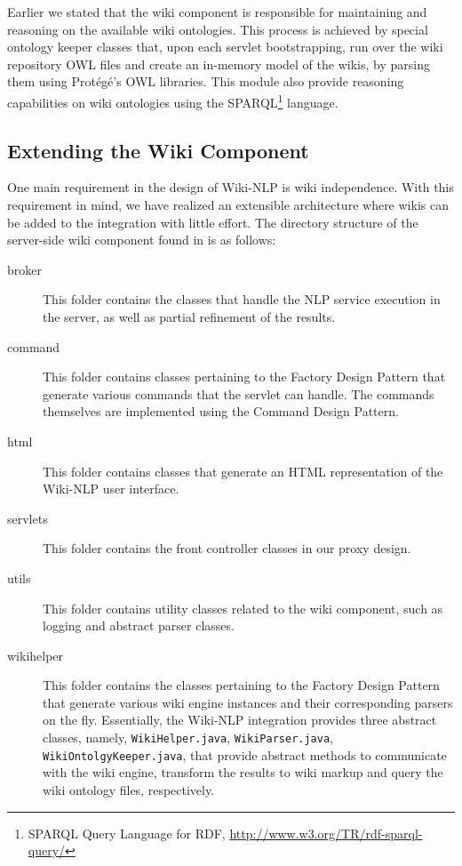 \blankline
Earlier we stated that the wiki component is responsible for maintaining and reasoning on the available wiki ontologies. This process is achieved by special ontology keeper classes that, upon each servlet bootstrapping, run over the wiki repository OWL files and create an in-memory model of the wikis, by parsing them using Prot\'{e}g\'{e}'s OWL libraries. This module also provide reasoning capabilities on wiki ontologies using the SPARQL\footnote{SPARQL Query Language for RDF, \url{http://www.w3.org/TR/rdf-sparql-query/}} language.

\subsection{Extending the Wiki Component}
One main requirement in the design of Wiki-NLP is wiki independence. With this requirement in mind, we have realized an extensible architecture where wikis can be added to the integration with little effort. The directory structure of the server-side wiki component found in  is as follows:

\begin{description}
\item[broker] This folder contains the classes that handle the NLP service execution in the \sa server, as well as partial refinement of the results.
\item[command] This folder contains classes pertaining to the Factory Design Pattern that generate various commands that the servlet can handle. The commands themselves are implemented using the Command Design Pattern. 
\item[html] This folder contains classes that generate an HTML representation of the Wiki-NLP user interface.
\item[servlets] This folder contains the front controller classes in our proxy design.
\item[utils] This folder contains utility classes related to the wiki component, such as logging and abstract parser classes.
\item[wikihelper] This folder contains the classes pertaining to the Factory Design Pattern that generate various wiki engine instances and their corresponding parsers on the fly. Essentially, the Wiki-NLP integration provides three abstract classes, namely, \texttt{WikiHelper.java}, \texttt{WikiParser.java}, \texttt{WikiOntolgyKeeper.java}, that provide abstract methods to communicate with the wiki engine, transform the results to wiki markup and query the wiki ontology files, respectively. 
\end{description}

